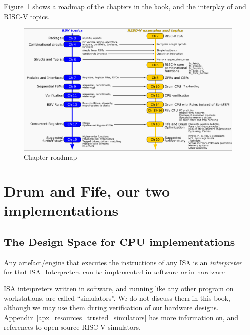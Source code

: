\vspace{1ex}

Figure~\ref{Fig_Chapter_Roadmap} shows a roadmap of the chapters in
the book, and the interplay of {\BSV} and RISC-V topics.
\begin{figure}[htbp]
  \centerline{\includegraphics[width=6in,angle=0]{Figures/Fig_Chapter_Roadmap}}
  \caption{\label{Fig_Chapter_Roadmap}Chapter roadmap}
\end{figure}


\section{Drum and Fife, our two implementations}

\label{Sec_Drum_and_Fife}


\subsection{The Design Space for CPU implementations}

\label{Sec_Interpreters}

Any artefact/engine that executes the instructions of any ISA is an
\emph{interpreter} for that ISA.  Interpreters can be implemented in
software or in hardware.

ISA interpreters written in software, and running like any other
program on workstations, are called ``simulators''.  We do not discuss
them in this book, although we may use them during verification of our
hardware designs.  Appendix~\ref{apx_resources_trusted_simulators} has
more information on, and references to open-source RISC-V simulators.

